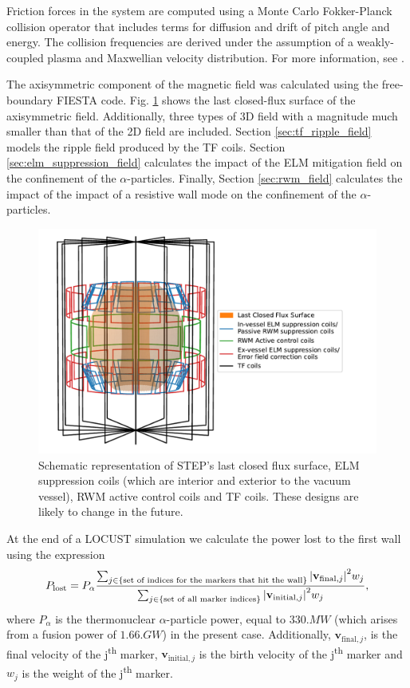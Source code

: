 \documentclass[10pt, a4paper, twoside]{article}
\begin{document}
Friction forces in the system are computed using a Monte Carlo Fokker-Planck collision operator that includes terms for diffusion and drift of pitch angle and energy. The collision frequencies are derived under the assumption of a weakly-coupled plasma and Maxwellian velocity distribution. For more information, see \cite{ward2021}.

The axisymmetric component of the magnetic field was calculated using the free-boundary FIESTA code. Fig. \ref{fig:coil_plot_3d} shows the last closed-flux surface of the axisymmetric field. Additionally, three types of 3D field with a magnitude much smaller than that of the 2D field are included. Section \ref{sec:tf_ripple_field} models the ripple field produced by the TF coils. Section \ref{sec:elm_suppression_field} calculates the impact of the ELM mitigation field on the confinement of the $\alpha$-particles. Finally, Section \ref{sec:rwm_field} calculates the impact of the impact of a resistive wall mode on the confinement of the $\alpha$-particles.

\begin{figure}[htpb]
    \centering
    \includegraphics[width=0.8\linewidth]{Figures/coil_plot_3d.pdf}
    \caption{Schematic representation of STEP’s last closed flux surface, ELM suppression coils (which are interior and exterior to the vacuum vessel), RWM active control coils and TF coils. These designs are likely to change in the future. 
}
    \label{fig:coil_plot_3d}
\end{figure}

At the end of a LOCUST simulation we calculate the power lost to the first wall using the expression 
\begin{equation} 
P_{\text{lost}} = P_\alpha \frac{\sum_{j\in \{\text{set of indices for the markers that hit the wall}\}}\abs{\textbf{v}_{\text{final}, j}}^2w_j}{\sum_{j \in \{\text{set of all marker indices}\}} \abs{\mathbf{v}_{\text{initial}, j}}^2w_j}, 
\end{equation}
where $P_\alpha$ is the thermonuclear $\alpha$-particle power, equal to $\si{330.MW}$ (which arises from a fusion power of $1.\si{66.GW}$) in the present case. Additionally, $\mathbf{v}_{\text{final}, j}$,  is the final velocity of the j\textsuperscript{th} marker, $\mathbf{v}_{\text{initial}, j}$ is the birth velocity of the j\textsuperscript{th} marker and $w_j$ is the weight of the j\textsuperscript{th} marker.
\end{document}
